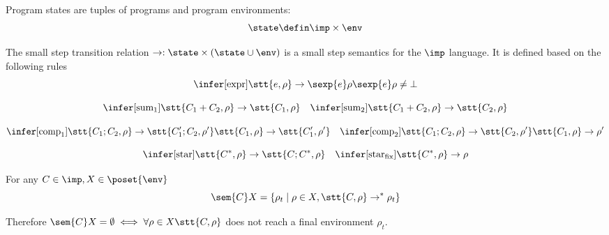 \begin{definition}
  Program states are tuples of programs and program
  environments: \[\state \defin \imp \times \env\]
\end{definition}

\begin{definition}\label{def:sosem}
  The small step transition relation \(\to : \state \times (\state
  \cup \env)\) is a small step semantics for the
  \(\imp\) language. It is defined based on the following rules
  \[\infer[\text{expr}]
          {\stt{e, \rho} \to \sexp{e}\rho}
          {\sexp{e}\rho \neq \bot}\]
          
          \[\infer[\text{sum}_1]
                  {\stt{C_1 + C_2, \rho} \to \stt{C_1, \rho}}
                  {} \quad
                  \infer[\text{sum}_2]
                        {\stt{C_1 + C_2, \rho} \to \stt{C_2, \rho}}
                        {}\]
                        
                        \[\infer[\text{comp}_1]
                                {\stt{C_1; C_2, \rho} \to \stt{C_1'; C_2, \rho'}}
                                {\stt{C_1, \rho} \to \stt{C_1', \rho'}} \quad
                                \infer[\text{comp}_2]
                                      {\stt{C_1; C_2, \rho} \to \stt{C_2, \rho'}}
                                      {\stt{C_1, \rho} \to \rho'}\]

                                      \[\infer[\text{star}]
                                              {\stt{C^*, \rho} \to \stt{C;C^*, \rho}}
                                              {} \quad
                                              \infer[\text{star}_{\text{fix}}]
                                                    {\stt{C^*, \rho} \to \rho}
                                                    {}\]
\end{definition}

\begin{lemma}
  For any \(C\in\imp, X \in \poset{\env}\) \[\sem{C}X = \{\rho_t \mid
  \rho \in X, \stt{C, \rho} \to^* \rho_t\}\] 
\end{lemma}

Therefore \(\sem{C}X = \emptyset \iff \forall \rho \in X
\stt{C,\rho}\) does not reach a final environment \(\rho_t\).

